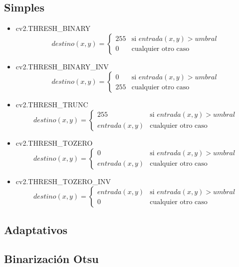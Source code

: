 \subsection{Simples}
\begin{itemize}
\item cv2.THRESH\_BINARY
\begin{equation*}
destino(x, y) =
\begin{cases}
255 & \text{si } entrada(x, y) > umbral \\
0 & \text{cualquier otro caso}
\end{cases}
\end{equation*}
\item cv2.THRESH\_BINARY\_INV
\begin{equation*}
destino(x, y) =
\begin{cases}
0 & \text{si } entrada(x, y) > umbral \\
255 & \text{cualquier otro caso}
\end{cases}
\end{equation*}
\item cv2.THRESH\_TRUNC
\begin{equation*}
destino(x, y) =
\begin{cases}
255 & \text{si } entrada(x, y) > umbral \\
entrada(x, y) & \text{cualquier otro caso}
\end{cases}
\end{equation*}
\item cv2.THRESH\_TOZERO
\begin{equation*}
destino(x, y) =
\begin{cases}
0 & \text{si } entrada(x, y) > umbral \\
entrada(x, y) & \text{cualquier otro caso}
\end{cases}
\end{equation*}
\item cv2.THRESH\_TOZERO\_INV
\begin{equation*}
destino(x, y) =
\begin{cases}
entrada(x, y) & \text{si } entrada(x, y) > umbral \\
0 & \text{cualquier otro caso}
\end{cases}
\end{equation*}
\end{itemize}
\subsection{Adaptativos}
\subsection{Binarización Otsu}

